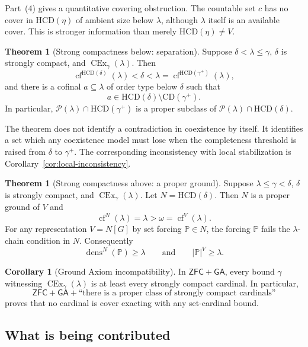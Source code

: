 \documentclass[11pt,letterpaper]{article}
\theoremstyle{definition}
\newtheorem{theorem}[definition]{Theorem}
\newtheorem{corollary}[definition]{Corollary}
\newcommand{\ZFC}{\mathsf{ZFC}}
\newcommand{\CEx}{\operatorname{CEx}}
\newcommand{\cf}{\operatorname{cf}}
\newcommand{\CD}{\mathrm{CD}}
\newcommand{\HCD}{\mathrm{HCD}}
\newcommand{\GA}{\mathsf{GA}}
\newcommand{\Pow}{\mathcal{P}}
\newcommand{\dens}{\operatorname{dens}}
\begin{document}
Part~(4) gives a quantitative covering obstruction. The countable set $c$ has no cover in $\HCD(\eta)$ of ambient size below $\lambda$, although $\lambda$ itself is an available cover. This is stronger information than merely $\HCD(\eta)\ne V$.

\begin{theorem}[Strong compactness below: separation]\label{thm:below-main}
Suppose $\delta<\lambda\le\gamma$, $\delta$ is strongly compact, and $\CEx_\gamma(\lambda)$. Then
\begin{equation}\label{eq:cf-separation-intro}
\cf^{\HCD(\delta)}(\lambda)<\delta<\lambda
   =\cf^{\HCD(\gamma^+)}(\lambda),
\end{equation}
and there is a cofinal $a\subseteq\lambda$ of order type below $\delta$ such that
\[
a\in\HCD(\delta)\setminus\CD(\gamma^+).
\]
In particular, $\Pow(\lambda)\cap\HCD(\gamma^+)$ is a proper subclass of $\Pow(\lambda)\cap\HCD(\delta)$.
\end{theorem}

The theorem does not identify a contradiction in coexistence by itself. It identifies a set which any coexistence model must lose when the completeness threshold is raised from $\delta$ to $\gamma^+$. The corresponding inconsistency with local stabilization is Corollary~\ref{cor:local-inconsistency}.

\begin{theorem}[Strong compactness above: a proper ground]\label{thm:ground-main}
Suppose $\lambda\le\gamma<\delta$, $\delta$ is strongly compact, and $\CEx_\gamma(\lambda)$. Let $N=\HCD(\delta)$. Then $N$ is a proper ground of $V$ and
\[
\cf^N(\lambda)=\lambda>\omega=\cf^V(\lambda).
\]
For any representation $V=N[G]$ by set forcing $\mathbb P\in N$, the forcing $\mathbb P$ fails the $\lambda$-chain condition in $N$. Consequently
\[
\dens^N(\mathbb P)\ge\lambda
\qquad\text{and}\qquad |\mathbb P|^V\ge\lambda.
\]
\end{theorem}

\begin{corollary}[Ground Axiom incompatibility]\label{cor:ga-main}
In $\ZFC+\GA$, every bound $\gamma$ witnessing $\CEx_\gamma(\lambda)$ is at least every strongly compact cardinal. In particular,
\[
\ZFC+\GA+\text{``there is a proper class of strongly compact cardinals''}
\]
proves that no cardinal is cover exacting with any set-cardinal bound.
\end{corollary}

\subsection{What is being contributed}
\end{document}
